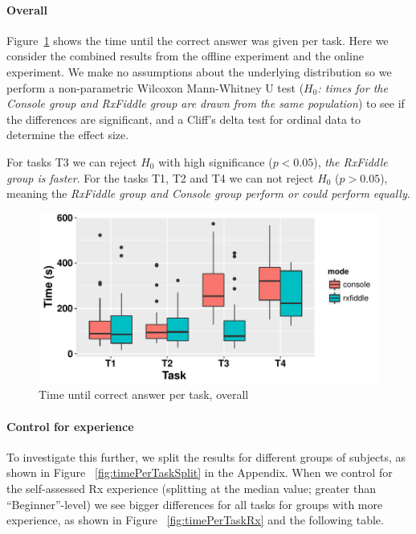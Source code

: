 \paragraph{Overall} Figure~\ref{fig:timePerTask} 
shows the time until the correct answer was given
per task.  Here we consider the combined results from the offline experiment
and the online experiment.  We make no assumptions about the underlying
distribution so we perform a non-parametric Wilcoxon Mann-Whitney U test
(\textit{$ H_0 $:  times for the Console group and RxFiddle group are
drawn from the same population}) to see if the differences are
significant, and a Cliff's delta test for ordinal data to determine the
effect size.

\begin{centering}
    
\end{centering}

For tasks T3 we can reject $ H_0 $ with high significance ($ p < 0.05 $),
\emph{the RxFiddle group is faster}.  For the tasks T1, T2 and T4 we can
not reject $ H_0 $ ($ p > 0.05 $), meaning the \emph{RxFiddle group and
Console group perform or could perform equally}.

\begin{figure}[t]
    \includegraphics[width=\columnwidth]{images/timePerTask.pdf}
    \caption{Time until correct answer per task, overall}%
    \label{fig:timePerTask}
\end{figure}

\paragraph{Control for experience} To investigate this further, we split
the results for different groups of subjects, as shown in Figure~%
\ref{fig:timePerTaskSplit} in the Appendix.  When we control for the
self-assessed Rx experience (splitting at the median value; greater than
``Beginner''-level) we see bigger differences for all tasks for groups
with more experience, as shown in Figure~%
\ref{fig:timePerTaskRx} and the following table.

